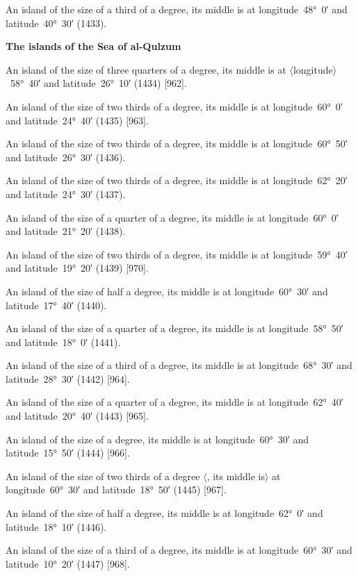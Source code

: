 \documentclass[11pt]{article}
\newcommand{\Pg}[1]{\marginpar{\footnotesize #1}}
\newcommand{\Ang}[1]{\ensuremath{#1}}
\begin{document}
An island of the size of a third of a degree, its middle is at longitude~48°~0′ and latitude~40°~30′ (1433).

\par\medskip\begin{center}\bfseries The islands of the Sea of al-Qulzum\end{center}\par

An island of the size of three quarters of a degree, its middle is at \Ang{\langle}longitude\Ang{\rangle}~58°~40′ and latitude~26°~10′ (1434) [962].

An island of the size of two thirds of a degree, its middle is at longitude~60°~0′ and latitude~24°~40′ (1435) [963].

An island of the size of two thirds of a degree, its middle is at longitude~60°~50′ and latitude~26°~30′ (1436).

An island of the size of two thirds of a degree, its middle is at longitude~62°~20′ and latitude~24°~30′ (1437).

An island of the size of a quarter of a degree, its middle is at longitude~60°~0′ and latitude~21°~20′ (1438).

An island of the size of two thirds of a degree, its middle is at longitude~59°~40′ and latitude~19°~20′ (1439) [970]\Pg{p. 94}.

An island of the size of half a degree, its middle is at longitude~60°~30′ and latitude~17°~40′ (1440).

An island of the size of a quarter of a degree, its middle is at longitude~58°~50′ and latitude~18°~0′ (1441).

An island of the size of a third of a degree, its middle is at longitude~68°~30′ and latitude~28°~30′ (1442) [964].

An island of the size of a quarter of a degree, its middle is at longitude~62°~40′ and latitude~20°~40′ (1443) [965].

An island of the size of a degree, its middle is at longitude~60°~30′ and latitude~15°~50′ (1444) [966].

An island of the size of two thirds of a degree \Ang{\langle}, its middle is\Ang{\rangle} at longitude~60°~30′ and latitude~18°~50′ (1445) [967].

An island of the size of half a degree, its middle is at longitude~62°~0′ and latitude~18°~10′ (1446).

An island of the size of a third of a degree, its middle is at longitude~60°~30′ and latitude~10°~20′ (1447) [968].
\end{document}
